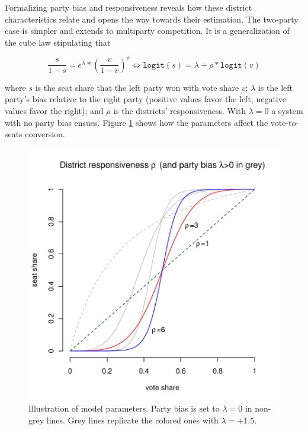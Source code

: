 \documentclass[letter,12pt]{article}
\begin{document}
Formalizing party bias and responsiveness reveals how these district characteristics relate and opens the way towards their estimation. The two-party case is simpler \citep{taagepera.CubeLaw.1973,tufte1973seatsVotes,king.browning1987biasRespUS} and extends to multiparty competition. It is a generalization of the cube law stipulating that 

\begin{equation}\label{E:kingBi}
 \frac{s}{1-s} = e^\lambda *  \left(\frac{v}{1-v}\right)^\rho \iff
 \texttt{logit}(s) = \lambda + \rho *  \texttt{logit}(v)
\end{equation}\label{E:cubeLaw}

\noindent where $s$ is the seat share that the left party won with vote share $v$; $\lambda$ is the left party's bias relative to the right party (positive values favor the left, negative values favor the right); and $\rho$ is the districts' responsiveness. With $\lambda=0$ a system with no party bias ensues. Figure \ref{F:lambdaRhoEx} shows how the parameters affect the vote-to-seats conversion. 


\begin{figure}
\begin{center}
    \includegraphics[width=.55\columnwidth]{rhoExample.pdf} 
\caption{Illustration of model parameters. Party bias is set to $\lambda=0$ in non-grey lines. Grey lines replicate the colored ones with $\lambda=+1.5$.}\label{F:lambdaRhoEx}
\end{center}
\end{figure}
\end{document}
